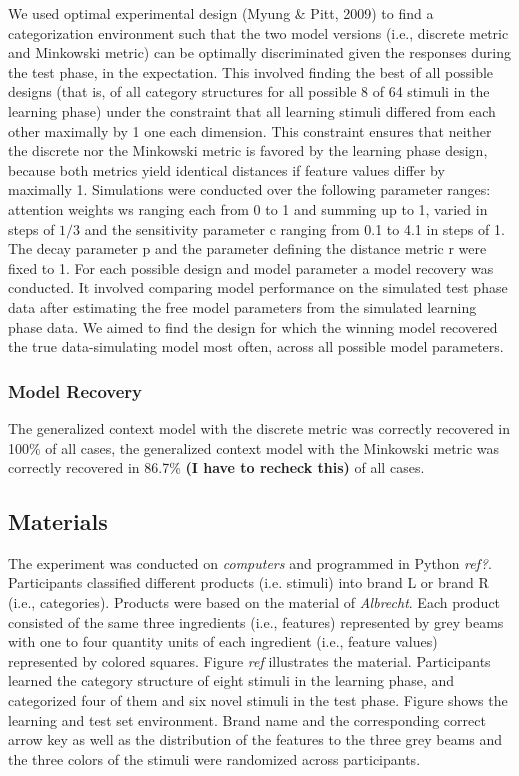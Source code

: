 \documentclass[a4paper,man,natbib]{apa6}
\begin{document}
We used optimal experimental design (Myung & Pitt, 2009) to find a categorization environment such that the two model versions (i.e., discrete metric and Minkowski metric) can be optimally discriminated given the responses during the test phase, in the expectation. This involved finding the best of all possible designs (that is, of all category structures for all possible 8 of 64 stimuli in the learning phase) under the constraint that all learning stimuli differed from each other maximally by 1 one each dimension. This constraint ensures that neither the discrete nor the Minkowski metric is favored by the learning phase design, because both metrics yield identical distances if feature values differ by maximally 1. Simulations were conducted over the following parameter ranges: attention weights ws ranging each from 0 to 1 and summing up to 1, varied in steps of $1/3$ and the sensitivity parameter c ranging from 0.1 to 4.1 in steps of 1. The decay parameter p and the parameter defining the distance metric r were fixed to 1. For each possible design and model parameter a model recovery was conducted. It involved comparing model performance on the simulated test phase data after estimating the free model parameters from the simulated learning phase data. We aimed to find the design for which the winning model recovered the true data-simulating model most often, across all possible model parameters.

\subsubsection{Model Recovery}
The generalized context model with the discrete metric was correctly recovered in 100\% of all cases, the generalized context model with the Minkowski metric was correctly recovered in 86.7\% \textbf{(I have to recheck this)} of all cases. 

\subsection{Materials}
The experiment was conducted on \textit{computers} and programmed in Python \textit{ref?}.  Participants classified different products (i.e. stimuli) into brand L or brand R (i.e., categories). Products were based on the material of \textit{Albrecht}. Each product consisted of the same three ingredients (i.e., features) represented by grey beams with one to four quantity units of each ingredient (i.e., feature values) represented by colored squares. Figure \textit{ref} illustrates the material. Participants learned the category structure of eight stimuli in the learning phase, and categorized four of them and six novel stimuli in the test phase. Figure  shows the learning and test set environment. Brand name and the corresponding correct arrow key as well as the distribution of the features to the three grey beams and the three colors of the stimuli were randomized across participants.
\end{document}
